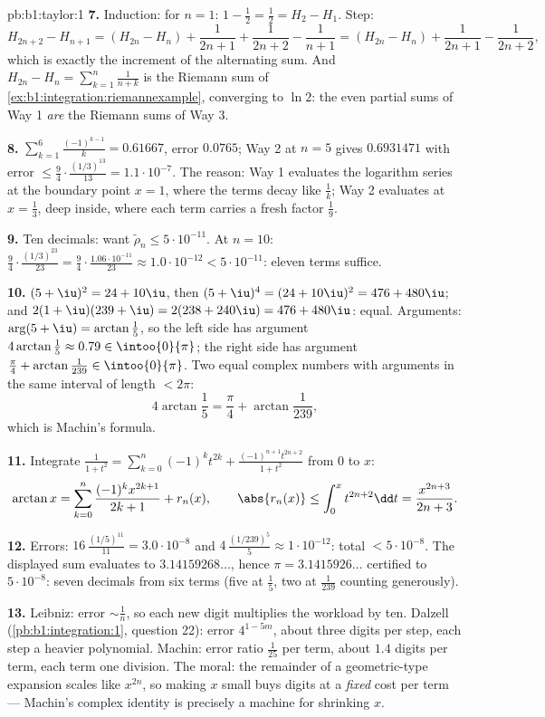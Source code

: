 \begin{solution}{pb:b1:taylor:1}
\textbf{7.} Induction: for $n = 1$: $1 - \frac12 = \frac12 = H_2
- H_1$. Step:
\[
H_{2n+2} - H_{n+1} = (H_{2n} - H_n) + \frac{1}{2n+1} +
\frac{1}{2n+2} - \frac{1}{n+1}
= (H_{2n} - H_n) + \frac{1}{2n+1} - \frac{1}{2n+2},
\]
which is exactly the increment of the alternating sum. And
$H_{2n} - H_n = \sum_{k=1}^{n}\frac{1}{n+k}$ is the Riemann sum
of \cref{ex:b1:integration:riemannexample}, converging to $\ln
2$: the even partial sums of Way 1 \emph{are} the Riemann sums
of Way 3.

\textbf{8.} $\sum_{k=1}^{6}\frac{(-1)^{k-1}}{k} = 0.61667$,
error $0.0765$; Way 2 at $n = 5$ gives $0.6931471$ with error
$\leq \frac94\cdot\frac{(1/3)^{13}}{13} = 1.1\cdot10^{-7}$. The
reason: Way 1 evaluates the logarithm series at the boundary
point $x = 1$, where the terms decay like $\frac1k$; Way 2
evaluates at $x = \frac13$, deep inside, where each term carries
a fresh factor $\frac19$.

\textbf{9.} Ten decimals: want $\tilde\rho_n \leq
5\cdot10^{-11}$. At $n = 10$: $\frac94 \cdot
\frac{(1/3)^{23}}{23} = \frac94\cdot\frac{1.06\cdot10^{-11}}{23}
\approx 1.0\cdot10^{-12} < 5\cdot10^{-11}$: eleven terms
suffice.

\textbf{10.} $(5+\iu)^2 = 24 + 10\iu$, then $(5+\iu)^4 = (24 +
10\iu)^2 = 476 + 480\iu$; and $2(1+\iu)(239+\iu) = 2(238 +
240\iu) = 476 + 480\iu$: equal. Arguments: $\arg(5 + \iu) =
\arctan\frac15$, so the left side has argument
$4\arctan\frac15 \approx 0.79 \in \intoo{0}{\pi}$; the right
side has argument $\frac\pi4 + \arctan\frac{1}{239} \in
\intoo{0}{\pi}$. Two equal complex numbers with arguments in the
same interval of length $< 2\pi$:
\[
4\arctan\frac15 = \frac\pi4 + \arctan\frac{1}{239} ,
\]
which is Machin's formula.

\textbf{11.} Integrate $\frac{1}{1+t^2} = \sum_{k=0}^n (-1)^k
t^{2k} + \frac{(-1)^{n+1}t^{2n+2}}{1+t^2}$ from $0$ to $x$:
\[
\arctan x = \sum_{k=0}^{n}\frac{(-1)^k x^{2k+1}}{2k+1} +
r_n(x),
\qquad
\abs{r_n(x)} \leq \int_0^x t^{2n+2}\dd t =
\frac{x^{2n+3}}{2n+3} .
\]

\textbf{12.} Errors: $16\,\frac{(1/5)^{11}}{11} = 3.0\cdot
10^{-8}$ and $4\,\frac{(1/239)^5}{5} \approx 1\cdot10^{-12}$:
total $< 5\cdot10^{-8}$. The displayed sum evaluates to
$3.14159268\dots$, hence $\pi = 3.1415926\dots$ certified to
$5\cdot10^{-8}$: seven decimals from six terms (five at
$\frac15$, two at $\frac1{239}$ counting generously).

\textbf{13.} Leibniz: error $\sim \frac1n$, so each new digit
multiplies the workload by ten. Dalzell
(\cref{pb:b1:integration:1}, question 22): error $4^{1-5m}$,
about three digits per step, each step a heavier polynomial.
Machin: error ratio $\frac{1}{25}$ per term, about $1.4$ digits
per term, each term one division. The moral: the remainder of a
geometric-type expansion scales like $x^{2n}$, so making $x$
small buys digits at a \emph{fixed} cost per term --- Machin's
complex identity is precisely a machine for shrinking $x$.


\end{solution}
